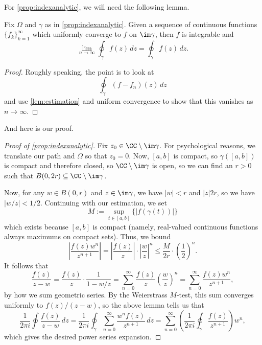 For \autoref{prop:indexanalytic}, we will need the following lemma.
\begin{lemma}
	Fix $\Omega$ and $\gamma$ as in \autoref{prop:indexanalytic}. Given a sequence of continuous functions $\{f_k\}_{k=1}^\infty$ which uniformly converge to $f$ on $\im\gamma$, then $f$ is integrable and
	\[\lim_{n\to\infty}\oint_\gamma f(z)\,dz=\oint_\gamma f(z)\,dz.\]
\end{lemma}
\begin{proof}
	Roughly speaking, the point is to look at
	\[\oint_\gamma(f-f_n)(z)\,dz\]
	and use \autoref{lem:estimation} and uniform convergence to show that this vanishes as $n\to\infty$.
\end{proof}
And here is our proof.
\begin{proof}[Proof of \autoref{prop:indexanalytic}]
	Fix $z_0\in\CC\setminus\im\gamma$. For psychological reasons, we translate our path and $\Omega$ so that $z_0=0$. Now, $[a,b]$ is compact, so $\gamma([a,b])$ is compact and therefore closed, so $\CC\setminus\im\gamma$ is open, so we can find an $r>0$ such that $B(0,2r)\subseteq\CC\setminus\im\gamma$.

	Now, for any $w\in B(0,r)$ and $z\in\im\gamma$, we have $|w|<r$ and $|z|2r$, so we have $|w/z|<1/2$. Continuing with our estimation, we set
	\[M:=\sup_{t\in[a,b]}\{|f(\gamma(t))|\}\]
	which exists because $[a,b]$ is compact (namely, real-valued continuous functions always maximums on compact sets). Thus, we bound
	\[\left|\frac{f(z)w^n}{z^{n+1}}\right|=\left|\frac{f(z)}z\right|\cdot\left|\frac wz\right|^n\le\frac M{2r}\cdot\left(\frac12\right)^n.\]
	It follows that
	\[\frac{f(z)}{z-w}=\frac{f(z)}z\cdot\frac1{1-w/z}=\sum_{n=0}^\infty\frac{f(z)}z\left(\frac wz\right)^n=\sum_{n=0}^\infty\frac{f(z)w^n}{z^{n+1}},\]
	by how we sum geometric series. By the Weierstrass $M$-test, this sum converges uniformly to $f(z)/(z-w)$, so the above lemma tells us that
	\[\frac1{2\pi i}\oint\frac{f(z)}{z-w}\,dz=\frac1{2\pi i}\oint_\gamma\sum_{n=0}^\infty\frac{w^nf(z)}{z^{n+1}}\,dz=\sum_{n=0}^\infty\left(\frac1{2\pi i}\oint_\gamma\frac{f(z)}{z^{n+1}}\right)w^n,\]
	which gives the desired power series expansion.
\end{proof}